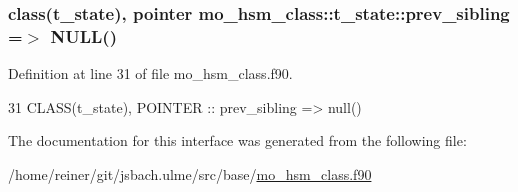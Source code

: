 \subsubsection[{prev\+\_\+sibling}]{\setlength{\rightskip}{0pt plus 5cm}class({\bf t\+\_\+state}), pointer mo\+\_\+hsm\+\_\+class\+::t\+\_\+state\+::prev\+\_\+sibling =$>$ N\+U\+L\+L()}\label{structmo__hsm__class_1_1t__state_a96f33ab989c4e792345834adef8e86cf}


Definition at line 31 of file mo\+\_\+hsm\+\_\+class.\+f90.


\begin{DoxyCode}
31     \textcolor{keywordtype}{CLASS}(t\_state), \textcolor{keywordtype}{POINTER}     :: prev\_sibling => null()
\end{DoxyCode}


The documentation for this interface was generated from the following file\+:\begin{DoxyCompactItemize}
\item 
/home/reiner/git/jsbach.\+ulme/src/base/\hyperlink{mo__hsm__class_8f90}{mo\+\_\+hsm\+\_\+class.\+f90}\end{DoxyCompactItemize}
